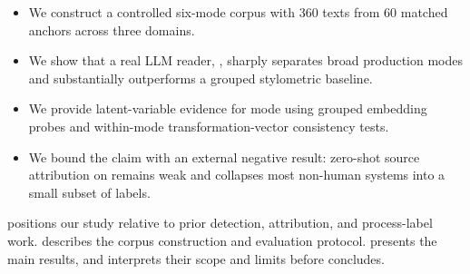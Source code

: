 \begin{itemize}[leftmargin=*,itemsep=0pt,topsep=0pt]
    \item We construct a controlled six-mode corpus with 360 texts from 60 matched \hcthree anchors across three domains.
    \item We show that a real LLM reader, \gptfourone, sharply separates broad production modes and substantially outperforms a grouped stylometric baseline.
    \item We provide latent-variable evidence for mode using grouped embedding probes and within-mode transformation-vector consistency tests.
    \item We bound the claim with an external negative result: zero-shot source attribution on \semeval remains weak and collapses most non-human systems into a small subset of labels.
\end{itemize}

  positions our study relative to prior detection, attribution, and process-label work.  describes the corpus construction and evaluation protocol.  presents the main results, and  interprets their scope and limits before  concludes.
